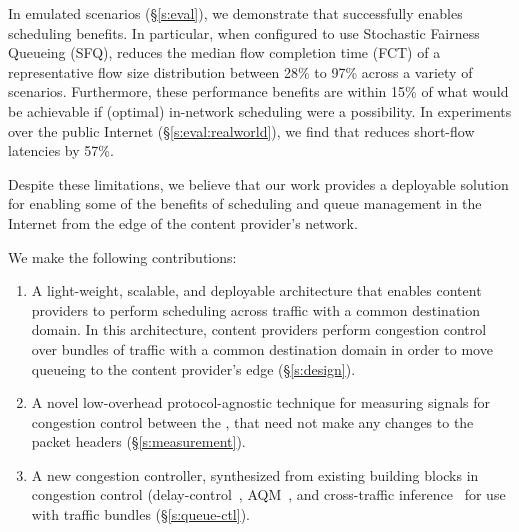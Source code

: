 In emulated scenarios (\S\ref{s:eval}), we demonstrate that \name successfully enables scheduling benefits. In particular, when configured to use Stochastic Fairness Queueing (SFQ),
\name reduces the median flow completion time (FCT) of a representative flow size distribution between 28\% to 97\% across a variety of scenarios. Furthermore, these performance benefits are within 15\% of what would be achievable if (optimal) in-network scheduling were a possibility.
In experiments over the public Internet (\S\ref{s:eval:realworld}), we find that \name reduces short-flow latencies by 57\%.


Despite these limitations, we believe that our work provides a deployable solution for enabling some of the benefits of scheduling and queue management in the Internet from the edge of the content provider's network.
 \fi
 
We make the following contributions:
\begin{enumerate}
    \item A light-weight, scalable, and deployable architecture that enables content providers to perform scheduling across traffic with a common destination domain. In this architecture, content providers perform congestion control over bundles of traffic with a common destination domain in order to move queueing to the content provider's edge (\S\ref{s:design}).
     \item A novel low-overhead protocol-agnostic technique for measuring signals for congestion control between the \pair, that need not make any changes to the packet headers (\S\ref{s:measurement}).
     \item A new congestion controller, synthesized from existing building blocks in congestion control (delay-control~\cite{copa}, AQM~\cite{pie}, and cross-traffic inference~\cite{nimbus} for use with traffic bundles (\S\ref{s:queue-ctl}).
\end{enumerate}
\fi
